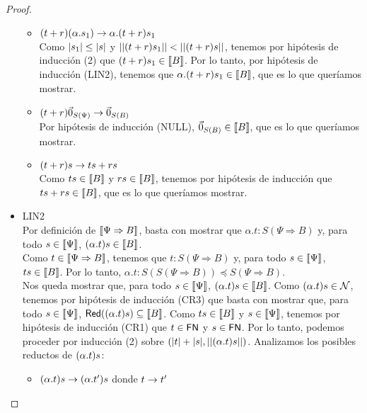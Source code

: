 \begin{proof}
\begin{itemize}
\begin{itemize}
          \item \( (t + r) (\alpha . s_1) \rightarrow \alpha . (t + r) s_1 \)
          \\ Como \( |s_1| \leq |s| \) y \( ||(t + r) s_1|| < ||(t + r) s|| \), tenemos por hipótesis de inducción (2) que \( (t + r) s_1 \in \llbracket B\rrbracket \). Por lo tanto, por hipótesis de inducción (LIN2), tenemos que \( \alpha . (t + r) s_1 \in \llbracket B\rrbracket \), que es lo que queríamos mostrar.
          \item \( (t + r) \vec{0}_{S (\Psi)} \rightarrow \vec{0}_{S (B)} \)
          \\ Por hipótesis de inducción (NULL), \( \vec{0}_{S (B)} \in \llbracket B\rrbracket \), que es lo que queríamos mostrar.
          \item \( (t + r) s \rightarrow t s + r s \)
          \\ Como \( t s \in \llbracket B\rrbracket \) y \( r s \in \llbracket B\rrbracket \), tenemos por hipótesis de inducción que \( t s + r s \in \llbracket B\rrbracket \), que es lo que queríamos mostrar.
        \end{itemize}
      \item LIN2
        \\ Por definición de \( \llbracket\Psi \Rightarrow B\rrbracket \), basta con mostrar que \( \alpha . t : S(\Psi \Rightarrow B) \) y, para todo \( s \in \llbracket\Psi\rrbracket \), \( (\alpha . t) s \in \llbracket B\rrbracket \).
        \\ Como \( t \in \llbracket\Psi \Rightarrow B\rrbracket \), tenemos que \( t : S(\Psi \Rightarrow B) \) y, para todo \( s \in \llbracket\Psi\rrbracket \), \( t s \in \llbracket B\rrbracket \). Por lo tanto, \( \alpha . t : S(S(\Psi \Rightarrow B)) \preceq S(\Psi \Rightarrow B) \).
        \\ Nos queda mostrar que, para todo \( s \in \llbracket\Psi\rrbracket \), \( (\alpha . t) s \in \llbracket B\rrbracket \). Como \( (\alpha . t) s \in \mathcal{N} \), tenemos por hipótesis de inducción (CR3) que basta con mostrar que, para todo \( s \in \llbracket\Psi\rrbracket \), \( \mathsf{Red} ((\alpha . t) s) \subseteq \llbracket B\rrbracket \).  Como \( t s \in \llbracket B\rrbracket \) y \( s \in \llbracket\Psi\rrbracket \), tenemos por hipótesis de inducción (CR1) que \( t \in \mathsf{FN} \) y \( s \in \mathsf{FN} \). Por lo tanto, podemos proceder por inducción (2) sobre \( (|t| + |s|, ||(\alpha . t) s||) \). Analizamos los posibles reductos de \( (\alpha . t) s \):
        \begin{itemize}
          \item \( (\alpha . t) s \rightarrow (\alpha . t') s \) donde \( t \rightarrow t' \)

\end{itemize}
\end{itemize}
\end{proof}

